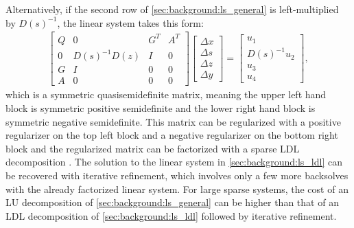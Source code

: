 Alternatively, if the second row of \eqref{sec:background:ls_general} is left-multiplied by $D(s)^{-1}$, the linear system takes this form:
%
\begin{align}
    \begin{bmatrix}
        Q & 0 & G^{T} & A^{T} \\
        0 & D(s)^{-1}D(z) & I & 0 \\
        G & I & 0 & 0 \\
        A & 0 & 0 & 0
    \end{bmatrix} 
    \begin{bmatrix}
        \Delta x \\
        \Delta s \\
        \Delta z \\
        \Delta y
    \end{bmatrix}
    = \begin{bmatrix}
        u_1 \\ D(s)^{-1} u_2 \\ u_3 \\ u_4
        \end{bmatrix} \label{sec:background:ls_ldl},
\end{align}
%
which is a symmetric quasisemidefinite matrix, meaning the upper left hand block is symmetric positive semidefinite and the lower right hand block is symmetric negative semidefinite. This matrix can be regularized with a positive regularizer on the top left block and a negative regularizer on the bottom right block and the regularized matrix can be factorized with a sparse LDL decomposition \cite{mattingley2012}. The solution to the linear system in \eqref{sec:background:ls_ldl} can be recovered with iterative refinement, which involves only a few more backsolves with the already factorized linear system. For large sparse systems, the cost of an LU decomposition of \eqref{sec:background:ls_general} can be higher than that of an LDL decomposition of \eqref{sec:background:ls_ldl} followed by iterative refinement. 
%
